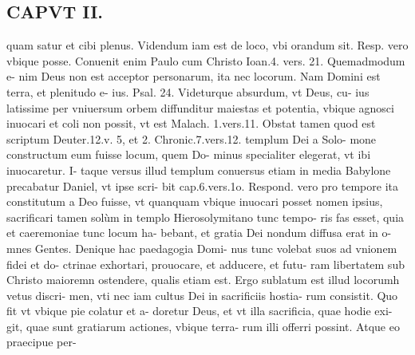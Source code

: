 \documentclass{article}
\begin{document}
\begin{pages}
\section*{CAPVT II. }
\marginpar{[ p.67 ]}\pstart quam satur et cibi plenus.  \pend\pstart Videndum iam est de loco, vbi orandum sit. Resp. vero vbique posse. Conuenit enim Paulo cum Christo Ioan.4. vers. 21. Quemadmodum e- nim Deus non est acceptor personarum, ita nec locorum. Nam Domini est terra, et plenitudo e- ius. Psal. 24. Videturque absurdum, vt Deus, cu- ius latissime per vniuersum orbem diffunditur maiestas et potentia, vbique agnosci inuocari et coli non possit, vt est Malach. 1.vers.11.  \pend\pstart Obstat tamen quod est scriptum Deuter.12.v. 5, et 2. Chronic.7.vers.12. templum Dei a Solo- mone constructum eum fuisse locum, quem Do- minus specialiter elegerat, vt ibi inuocaretur. I- taque versus illud templum conuersus etiam in media Babylone precabatur Daniel, vt ipse scri- bit cap.6.vers.1o. Respond. vero pro tempore ita constitutum a Deo fuisse, vt quanquam vbique inuocari posset nomen ipsius, sacrificari tamen solùm in templo Hierosolymitano tunc tempo- ris fas esset, quia et caeremoniae tunc locum ha- bebant, et gratia Dei nondum diffusa erat in o- mnes Gentes. Denique hac paedagogia Domi- nus tunc volebat suos ad vnionem fidei et do- ctrinae exhortari, prouocare, et adducere, et futu- ram libertatem sub Christo maioremn ostendere, qualis etiam est.  \pend\pstart Ergo sublatum est illud locorumh vetus discri- men, vti nec iam cultus Dei in sacrificiis hostia- rum consistit. Quo fit vt vbique pie colatur et a- doretur Deus, et vt illa sacrificia, quae hodie exi- git, quae sunt gratiarum actiones, vbique terra- rum illi offerri possint. Atque eo praecipue per-  \pend

\end{pages}
\end{document}
